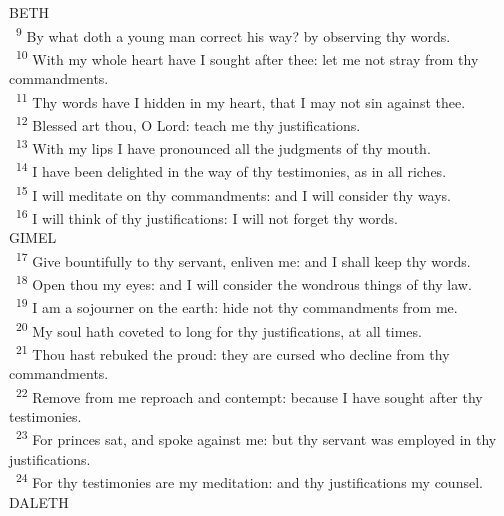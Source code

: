 \documentclass[a5paper,12pt]{article}
\begin{document}
\begin{multicols*}{2}
BETH\\

~\textsuperscript{9} By what doth a young man correct his way? by observing thy words.\\
~\textsuperscript{10} With my whole heart have I sought after thee: let me not stray from thy commandments.\\
~\textsuperscript{11} Thy words have I hidden in my heart, that I may not sin against thee.\\
~\textsuperscript{12} Blessed art thou, O Lord: teach me thy justifications.\\
~\textsuperscript{13} With my lips I have pronounced all the judgments of thy mouth.\\
~\textsuperscript{14} I have been delighted in the way of thy testimonies, as in all riches.\\
~\textsuperscript{15} I will meditate on thy commandments: and I will consider thy ways.\\
~\textsuperscript{16} I will think of thy justifications: I will not forget thy words.\\

GIMEL\\

~\textsuperscript{17} Give bountifully to thy servant, enliven me: and I shall keep thy words.\\
~\textsuperscript{18} Open thou my eyes: and I will consider the wondrous things of thy law.\\
~\textsuperscript{19} I am a sojourner on the earth: hide not thy commandments from me.\\
~\textsuperscript{20} My soul hath coveted to long for thy justifications, at all times.\\
~\textsuperscript{21} Thou hast rebuked the proud: they are cursed who decline from thy commandments.\\
~\textsuperscript{22} Remove from me reproach and contempt: because I have sought after thy testimonies.\\
~\textsuperscript{23} For princes sat, and spoke against me: but thy servant was employed in thy justifications.\\
~\textsuperscript{24} For thy testimonies are my meditation: and thy justifications my counsel.\\

DALETH\\


\end{multicols*}
\end{document}
